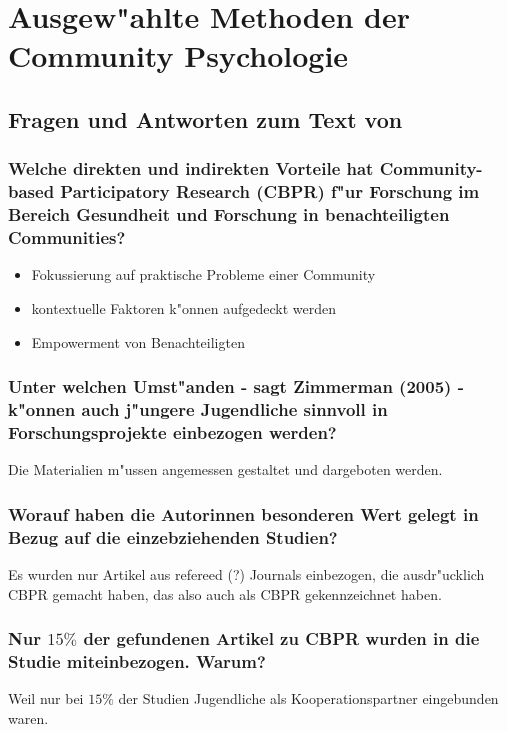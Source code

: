 \section{Ausgew"ahlte Methoden der Community Psychologie}

\subsection{Fragen und Antworten zum Text von \textcite{jacquez_youth_2012}}
\subsubsection{Welche direkten und indirekten Vorteile hat Community-based Participatory Research (CBPR) f"ur Forschung im Bereich Gesundheit und Forschung in benachteiligten Communities?}
\begin{itemize}
        \item Fokussierung auf praktische Probleme einer Community
        \item kontextuelle Faktoren k"onnen aufgedeckt werden
        \item Empowerment von Benachteiligten
\end{itemize}

\subsubsection{Unter welchen Umst"anden - sagt Zimmerman (2005) - k"onnen auch j"ungere Jugendliche sinnvoll in Forschungsprojekte einbezogen werden?}
Die Materialien m"ussen angemessen gestaltet und dargeboten werden.

\subsubsection{Worauf haben die Autorinnen besonderen Wert gelegt in Bezug auf die einzebziehenden Studien?}
Es wurden nur Artikel aus refereed (?) Journals einbezogen, die ausdr"ucklich CBPR gemacht haben, das also auch als CBPR gekennzeichnet haben.

\subsubsection{Nur $15\%$ der gefundenen Artikel zu CBPR wurden in die Studie miteinbezogen. Warum?}
Weil nur bei $15\%$ der Studien Jugendliche als Kooperationspartner eingebunden waren.

